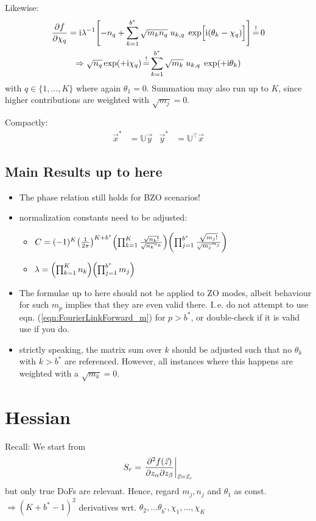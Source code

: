 \documentclass[
	english,
	a4paper,
	fontsize=10pt,
	parskip=half,
	titlepage=true,
	DIV=12,
	final
]{scrreprt}
\newcommand*{\Thus}{\ensuremath{\Rightarrow}\xspace}
\newcommand*{\transp}{\ensuremath{^\intercal}}
\newcommand*{\iunit}{\ensuremath{\mathrm{i}}}
\newcommand*{\equalCond}{  \mathop{=}\limits^!  }
\begin{document}
Likewise:
\begin{gather}
	\pdv{f}{\chi_q}
=
	\iunit\lambda^{-1}
	\qty[
		- n_q
		+
		\sum_{k=1}^{b^*}
			\sqrt{m_k n_q} \; u_{k,q} \; \exp[ \Big. \iunit(\theta_k - \chi_q) ]
	]
	\label{eqn:JacobianChi_m}
\equalCond
	0 \\
\Thus
	\sqrt{n_q} \exp(+\iunit \chi_q)
\equalCond
	\sum_{k=1}^{b^*}
	\sqrt{m_k} \; u_{k,q} \; \exp(+\iunit\theta_k)
	\label{eqn:FourierLinkBackward_m}
\end{gather}
with $q \in \{1, \ldots, K\}$ where again $\theta_1 = 0$. Summation may also run up to $K$, since higher contributions are weighted with $\sqrt{m_j} = 0$.

Compactly:
\begin{align}
	\vec{x}^{*} &= \mathbb{U} \vec{y}
&
	\vec{y}^{*} &= \mathbb{U}\transp \vec{x}
	\label{eqn:MatrixCondition_m}
\end{align}

\subsection{Main Results up to here}
\begin{itemize}
\item The phase relation still holds for BZO scenarios!
\item normalization constants need to be adjusted:
	\begin{itemize}
	\item $C =
	(-1)^K
	\qty(
		\frac{1}{2\pi}
	)^{K + b^*}
	\qty( \prod_{k=1}^{K}
		\frac
			{ \sqrt{n_k!} }
			{ \sqrt{n_k}^{n_k} }
	)
	\qty( \prod_{j=1}^{b^*}
		\frac
			{ \sqrt{m_j!} }
			{ \sqrt{m_j}^{m_j} }
	)$
	\item $\lambda =
	\qty( \prod_{k=1}^{K}   n_k )
	\qty( \prod_{j=1}^{b^*} m_j )$
	\end{itemize}
\item The formulae up to here should not be applied to ZO modes, albeit behaviour for such $m_p$
	implies that they are even valid there. I.\,e. do not attempt to use eqn.
	(\ref{eqn:FourierLinkForward_m}) for $p > b^*$, or double-check if it is valid use if you do.
\item strictly speaking, the matrix sum over $k$ should be adjusted such that no $\theta_k$ with
	$k > b^*$ are referenced. However, all instances where this happens are weighted with a
	$\sqrt{m_k} = 0$.
\end{itemize}

\section{Hessian}
Recall: We start from
\begin{align}
	S_r
=
	\eval{
		\pdv{f(\vec{z})}%
			{z_\alpha}{z_\beta}
	}_{\vec{z} = \vec{z}_r}
\end{align}
but only true DoFs are relevant. Hence, regard $m_j, n_j$ and $\theta_1$ as const. \\
\Thus $(K + b^* - 1)^{2}$ derivatives wrt. $\theta_2, \ldots \theta_{b^*}, \chi_1, \ldots, \chi_K$
\end{document}
